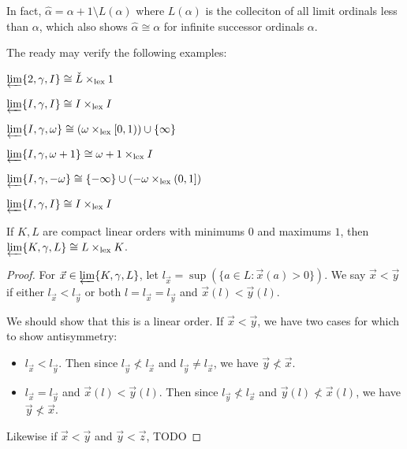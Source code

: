 \documentclass[11pt]{article}
\newcommand{\lexTimes}{\times_{\textrm{lex}}}
\newcommand{\vect}{\vec}
\begin{document}
  In fact, \(\hat\alpha=\alpha+1\setminus L(\alpha)\) where \(L(\alpha)\)
  is the colleciton of all limit ordinals less than \(\alpha\), which also
  shows \(\hat\alpha\cong\alpha\) for infinite successor ordinals \(\alpha\).

  \bigskip

  The ready may verify the following examples:

  \begin{example}
    \(\varprojlim\{2,\gamma,I\}\cong \check L\lexTimes 1\)
  \end{example}
  \begin{example}
    \(\varprojlim\{I,\gamma,I\}\cong I\lexTimes I\)
  \end{example}
  \begin{example}
    \(\varprojlim\{I,\gamma,\omega\}\cong (\omega\lexTimes[0,1))\cup\{\infty\}\)
  \end{example}
  \begin{example}
    \(\varprojlim\{I,\gamma,\omega+1\}\cong \omega+1\lexTimes I\)
  \end{example}
  \begin{example}
    \(\varprojlim\{I,\gamma,-\omega\}\cong \{-\infty\}\cup(-\omega\lexTimes(0,1])\)
  \end{example}
  \begin{example}
    \(\varprojlim\{I,\gamma,I\}\cong I\lexTimes I\)
  \end{example}

  \begin{theorem}
    If \(K,L\) are compact linear orders with minimums \(0\) and maximums
    \(1\), then \(\varprojlim\{K,\gamma,L\}\cong L\lexTimes K\).
  \end{theorem}

  \begin{proof}
    For \(\vect x\in\varprojlim\{K,\gamma,L\}\), let
    \(l_{\vect x}=\sup(\{a\in L:\vect x(a)>0\})\). We say
    \(\vect x<\vect y\) if either \(l_{\vect x}<l_{\vect y}\) or both
    \(l=l_{\vect x}=l_{\vect y}\) and \(\vect x(l)<\vect y(l)\).

    We should show that this is a linear order. If \(\vect x<\vect y\), we
    have two cases for which to show antisymmetry:
      \begin{itemize}
        \item \(l_{\vect x}<l_{\vect y}\). Then since
        \(l_{\vect y}\not< l_{\vect x}\) and
        \(l_{\vect y}\not= l_{\vect x}\), we have \(\vect y\not<\vect x\).
        \item \(l_{\vect x}=l_{\vect y}\) and \(\vect x(l)<\vect y(l)\).
        Then since \(l_{\vect y}\not< l_{\vect x}\) and
        \(\vect y(l)\not<\vect x(l)\), we have \(\vect y\not<\vect x\).
      \end{itemize}

    Likewise if \(\vect x<\vect y\) and \(\vect y<\vect z\), TODO
  \end{proof}

\newpage


\end{document}
